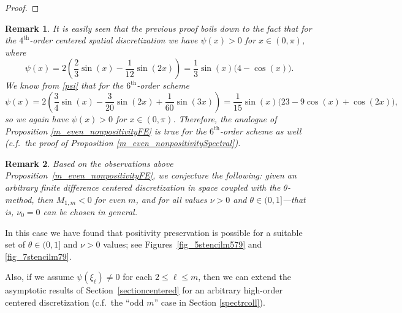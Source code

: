 \documentclass[smallextended,numbook,runningheads]{svjour3}     %
\newtheorem{remark}{Remark}
\newtheorem{remark}{Remark}
\begin{document}
\begin{description}[style=unboxed,leftmargin=0cm]
\begin{proof}
\end{proof}
\begin{remark}%
It is easily seen that the previous proof boils down to the fact that for the $4^\text{th}$-order centered spatial discretization we have $\psi(x)>0$ for $x\in(0,\pi)$, where
\[
\psi(x)=2 \left(\frac{2}{3}\sin (x)-\frac{1}{12} \sin (2 x)\right)=\frac{1}{3} \sin (x) \bigl(4-\cos (x)\bigr).
\]
We know from \eqref{psi} that for the $6^\text{th}$-order scheme
\[
\psi(x) = 2 \left(\frac{3}{4}\sin (x)-\frac{3}{20} \sin (2 x)+\frac{1}{60} \sin (3 x)\right) =
	\frac{1}{15} \sin (x) \bigl(23-9\cos (x)+\cos (2x)\bigr),
\]
so we again have $\psi(x)>0$ for $x\in(0,\pi)$. Therefore, the analogue of Proposition \ref{m_even_nonpositivityFE} is true for the $6^\text{th}$-order scheme as well (c.f.~the proof of Proposition \ref{m_even_nonpositivitySpectral}).
\end{remark}
\begin{remark}
	Based on the observations above Proposition~\ref{m_even_nonpositivityFE}, we conjecture the following:
	given an arbitrary finite difference centered discretization in space coupled with the $\theta$-method, then
	$M_{1,m} < 0$ for even $m$, and for \emph{all} values $\nu > 0$ and $\theta \in (0,1]$---that is, $\nu_0=0$ can be chosen in general.
\end{remark}
\item [{Case 2:} $m$ is {odd}.] In this case we have found that positivity preservation is possible for a suitable
set of $\theta\in(0,1]$ and $\nu>0$ values; see  Figures~\ref{fig_5stencilm579} and \ref{fig_7stencilm79}.

Also, if we assume $\psi(\xi_\ell) \ne 0$ for each $2\le\ell\le m$, then we can extend the asymptotic results of
Section~\ref{sectioncentered} for an arbitrary high-order centered discretization (c.f.~the ``odd $m$'' case in Section \ref{spectrcoll}).
\end{description}
\end{document}

